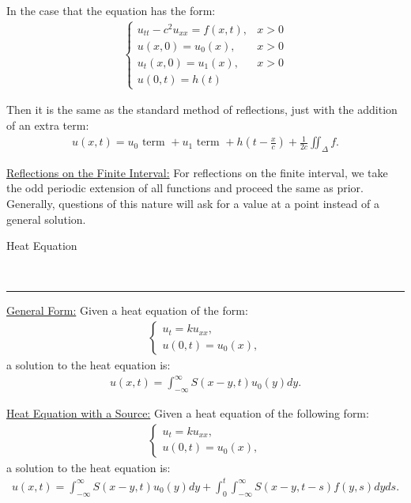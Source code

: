 \documentclass{article}
\newcommand{\header}[1]{\begin{large}\noindent #1\end{large}\\\rule{\textwidth}{0.5pt}}
\newcommand{\sheader}[1]{\underline{#1:}}
\begin{document}
In the case that the equation has the form: 
\begin{align*}
    \begin{cases}
        u_{tt} - c^2 u_{xx} = f(x, t), & x > 0 \\
        u(x, 0) = u_0(x), & x > 0\\
        u_t(x, 0) = u_1(x), & x > 0\\
        u(0, t) = h(t)
    \end{cases}
\end{align*}

Then it is the same as the standard method of reflections, just with the addition 
of an extra term:
\begin{align*}
    u(x, t) = u_0 \textrm{ term } + u_1 \textrm{ term } + h\left(t - \frac{x}{c}\right) + \frac{1}{2c} \iint_\Delta f.
\end{align*}

\sheader{Reflections on the Finite Interval} For reflections on the finite interval,
we take the odd periodic extension of all functions and proceed the same as prior.
Generally, questions of this nature will ask for a value at a point instead of 
a general solution.

\pagebreak

\header{Heat Equation}
\sheader{General Form} Given a heat equation of the form:
\begin{align*}
    \begin{cases}
        u_t = k u_{xx},\\
        u(0, t) = u_0(x),
    \end{cases}
\end{align*}
a solution to the heat equation is:
\begin{align*}
    u(x, t) = \int_{-\infty}^{\infty}S(x - y, t)u_0(y)dy.
\end{align*}

\sheader{Heat Equation with a Source} Given a heat equation of the following form:
\begin{align*}
    \begin{cases}
        u_t = ku_{xx},\\
        u(0, t) = u_0(x),
    \end{cases}
\end{align*}
a solution to the heat equation is:
\begin{align*}
    u(x, t) = \int_{-\infty}^{\infty} S(x - y, t)u_0(y)dy + \int_{0}^{t}\int_{-\infty}^{\infty} S(x -y, t-s)f(y, s)dyds.
\end{align*}
\end{document}
